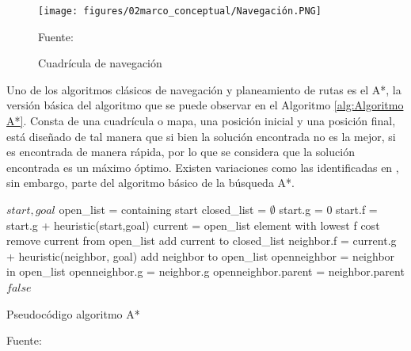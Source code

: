 \begin{figure}[h]
    \centering
    \texttt{[image: figures/02marco\_conceptual/Navegación.PNG]}
    \caption{\label{fig:ROS_navegacion} Cuadrícula de navegación} 
    Fuente: \cite{thrun_probabilistic_2005}
\end{figure}

Uno de los algoritmos clásicos de navegación y planeamiento de rutas es el A*, la versión básica del algoritmo que se puede observar en el Algoritmo \ref{alg:Algoritmo A*}. Consta de una cuadrícula o mapa, una posición inicial y una posición final, está diseñado de tal manera que si bien la solución encontrada no es la mejor, si es encontrada de manera rápida, por lo que se considera que la solución encontrada es un máximo óptimo. Existen variaciones como las identificadas en \cite{noauthor_global_nodate}, sin embargo, parte del algoritmo básico de la búsqueda A*.

\begin{algorithm}[H]
\centering
    \begin{algorithmic}[1]
        \Require $start, goal$
        \vspace{1mm}
        \hline
        \vspace{1mm}
        \State open\_list =  containing start
        \State  closed\_list = $\emptyset$
        \State  start.g = 0
        \State start.f = start.g + heuristic(start,goal)
            \State current = open\_list element with lowest f cost
            \State remove current from open\_list
            \State add current to closed\_list
                    \State neighbor.f = current.g + heuristic(neighbor, goal)
                        \State add neighbor to open\_list
                    \Else
                        \State openneighbor = neighbor in open\_list
                            \State openneighbor.g = neighbor.g
                            \State openneighbor.parent = neighbor.parent
                        \EndIf
                    \EndIf
                \EndIf
                    \State \Return $false$
                \EndIf
                \State {}
            \EndFor
        \EndWhile
        \vspace{1mm}
    \hline
    \vspace{1mm}
    \end{algorithmic}
\caption{Pseudocódigo algoritmo A*}
Fuente: \cite{candra_application_2021}
\label{alg:Algoritmo A*}
\end{algorithm}

